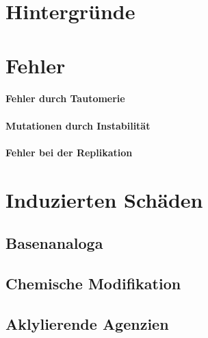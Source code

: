 

\section*{Hintergründe}

\section{Fehler}\label{sec:fehler}

\paragraph{Fehler durch Tautomerie}
\paragraph{Mutationen durch Instabilität}
\paragraph{Fehler bei der Replikation}

\section{Induzierten Schäden}\label{sec:induzierten-schaden}


\subsection{Basenanaloga}\label{subsec:basenanaloga}
\begin{bsp}
\end{bsp}
\subsection{Chemische Modifikation}\label{subsec:chemische-modifikation}
\begin{bsp}
\end{bsp}
\subsection{Aklylierende Agenzien}\label{subsec:aklylierende-agenzien}
\begin{bsp}
\end{bsp}
